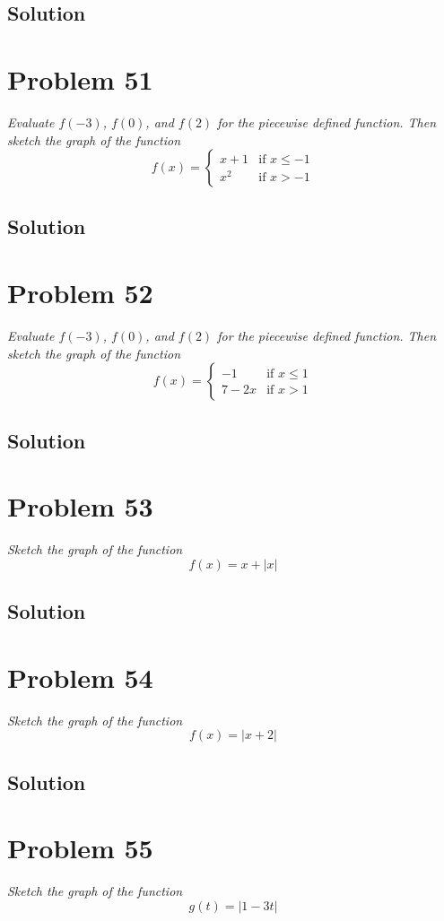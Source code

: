 \documentclass[11pt]{article}
\newcommand{\soln}{\subsection*}
\newcommand{\qn}{\textit}
\begin{document}
\soln{Solution}

\section*{Problem 51}

\qn{Evaluate $f(-3)$, $f(0)$, and $f(2)$ for the piecewise defined function. Then sketch the graph of the function}
\begin{equation}
	f(x)=
	\begin{cases}
		x+1 & \text{if } x \le -1\\
		x^2 & \text{if } x > -1
	\end{cases}
\end{equation}

\soln{Solution}

\section*{Problem 52}

\qn{Evaluate $f(-3)$, $f(0)$, and $f(2)$ for the piecewise defined function. Then sketch the graph of the function}
\begin{equation}
	f(x)=
	\begin{cases}
		-1 & \text{if } x \le 1\\
		7-2x & \text{if } x > 1
	\end{cases}
\end{equation}

\soln{Solution}

\section*{Problem 53}

\qn{Sketch the graph of the function $$f(x)=x+|x|$$}

\soln{Solution}

\section*{Problem 54}

\qn{Sketch the graph of the function $$f(x)=|x+2|$$}

\soln{Solution}

\section*{Problem 55}

\qn{Sketch the graph of the function $$g(t)=|1-3t|$$}
\end{document}
